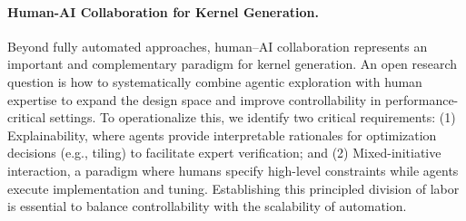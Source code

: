 \paragraph{Human-AI Collaboration for Kernel Generation.} Beyond fully automated approaches, human–AI collaboration represents an important and complementary paradigm for kernel generation. An open research question is how to systematically combine agentic exploration with human expertise to expand the design space and improve controllability in performance-critical settings. To operationalize this, we identify two critical requirements: (1) Explainability, where agents provide interpretable rationales for optimization decisions (e.g., tiling) to facilitate expert verification; and (2) Mixed-initiative interaction, a paradigm where humans specify high-level constraints while agents execute implementation and tuning. Establishing this principled division of labor is essential to balance controllability with the scalability of automation.